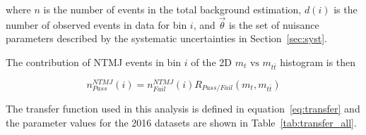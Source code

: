 where $n$ is the number of events in the total background estimation, $d(i)$ is the number of observed events in data for bin $i$, and $\vec{\theta}$ is the set of nuisance parameters described by the systematic uncertainties in Section~\ref{sec:syst}.


The contribution of NTMJ events in bin $i$ of the 2D $m_{t} \text{ vs } m_{t \bar{t}}$ histogram is then

\begin{equation}
	n^{NTMJ}_{Pass}(i) = n^{NTMJ}_{Fail}(i) R_{Pass/Fail} (m_{t}, m_{t \bar{t}})
\end{equation}


The  transfer function used in this analysis is defined in equation~\ref{eq:transfer} and the parameter values for the 2016 datasets are shown in Table~\ref{tab:transfer_all}.

%
%
%
%


%
%


